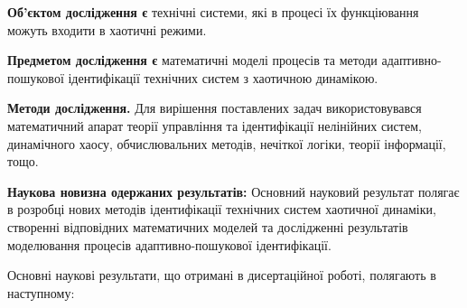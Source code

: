 \documentclass[a4paper,12pt]{atuaref}
\begin{document}
\textbf{Об'єктом дослідження є}
технічні системи, які в процесі їх функціювання можуть
входити в хаотичні режими.

\smallskip
\textbf{Предметом дослідження є}
математичні моделі процесів та методи
адаптивно-пошукової ідентифікації технічних систем з хаотичною динамікою.

\smallskip
\textbf{Методи дослідження.}
Для вирішення поставлених задач використовувався математичний апарат
теорії управління та ідентифікації нелінійних систем, динамічного хаосу,
обчислювальних методів, нечіткої логіки, теорії інформації, тощо.

\smallskip
\textbf{Наукова новизна одержаних результатів:}
Основний науковий результат полягає в розробці нових методів ідентифікації
технічних систем хаотичної динаміки, створенні відповідних математичних
моделей та дослідженні результатів моделювання процесів
адаптивно-пошукової ідентифікації.

Основні наукові результати, що отримані в дисертаційної роботі, полягають
 в наступному:
\end{document}
